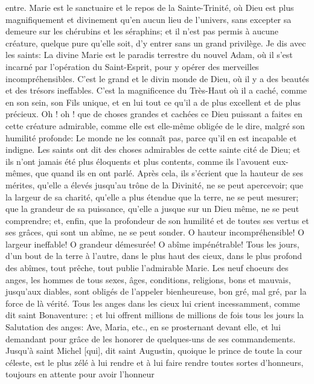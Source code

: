 entre. Marie est le sanctuaire et le repos de la Sainte-Trinité, où Dieu est plus magnifiquement et divinement qu'en
aucun lieu de l'univers, sans excepter sa demeure sur les chérubins et les séraphins; et il n'est pas permis à
aucune créature, quelque pure qu'elle soit, d'y entrer sans un grand privilège.
 Je dis avec les saints: La divine Marie est le paradis terrestre du nouvel Adam, où il s'est incarné par l'opération
du Saint-Esprit, pour y opérer des merveilles incompréhensibles. C'est le grand et le divin monde de Dieu, où il y a
des beautés et des trésors ineffables. C'est la magnificence du Très-Haut où il a caché, comme en son sein, son
Fils unique, et en lui tout ce qu'il a de plus excellent et de plus précieux. Oh ! oh ! que de choses grandes et
cachées ce Dieu puissant a faites en cette créature admirable, comme elle est elle-même obligée de le dire,
malgré son humilité profonde:  Le monde ne les connaît pas, parce qu'il en est
incapable et indigne.
 Les saints ont dit des choses admirables de cette sainte cité de Dieu; et ils n'ont jamais été plus éloquents et
plus contents, comme ils l'avouent eux-mêmes, que quand ils en ont parlé. Après cela, ils s'écrient que la hauteur
de ses mérites, qu'elle a élevés jusqu'au trône de la Divinité, ne se peut apercevoir; que la largeur de sa charité,
qu'elle a plus étendue que la terre, ne se peut mesurer; que la grandeur de sa puissance, qu'elle a jusque sur un
Dieu même, ne se peut comprendre; et, enfin, que la profondeur de son humilité et de toutes ses vertus et ses
grâces, qui sont un abîme, ne se peut sonder. O hauteur incompréhensible! O largeur ineffable! O grandeur
démesurée! O abîme impénétrable!
 Tous les jours, d'un bout de la terre à l'autre, dans le plus haut des cieux, dans le plus profond des abîmes, tout
prêche, tout publie l'admirable Marie. Les neuf choeurs des anges, les hommes de tous sexes, âges, conditions,
religions, bons et mauvais, jusqu'aux diables, sont obligés de l'appeler bienheureuse, bon gré, mal gré, par la force
de là vérité. Tous les anges dans les cieux lui crient incessamment, comme dit saint Bonaventure: ; et lui offrent millions de millions de fois tous les jours la Salutation des anges:
Ave, Maria, etc., en se prosternant devant elle, et lui demandant pour grâce de les honorer de quelques-uns de
ses commandements. Jusqu'à saint Michel [qui], dit saint Augustin, quoique le prince de toute la cour céleste, est
le plus zélé à lui rendre et à lui faire rendre toutes sortes d'honneurs, toujours en attente pour avoir l'honneur
